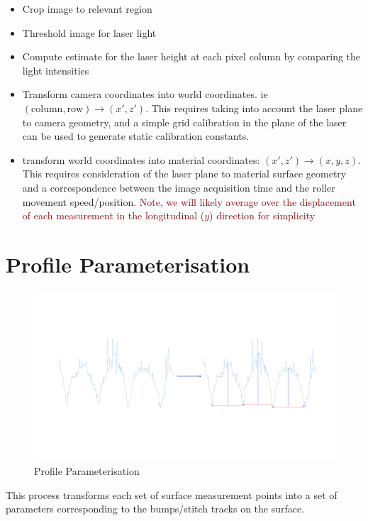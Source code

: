 \documentclass[12pt]{report}
\newcommand{\tcr}[1]{\textcolor{darkRed}{#1}}
\begin{document}
        \begin{itemize}
            \item Crop image to relevant region
            \item Threshold image for laser light
            \item Compute estimate for the laser height at each pixel column by comparing the light intensities
            \item Transform camera coordinates into world coordinates.
            ie $(\text{column}, \text{row}) \rightarrow (x',z')$. This requires taking into account the laser plane to camera geometry, and a simple grid calibration in the plane of the laser can be used to generate static calibration constants.
            \item transform world coordinates into material coordinates: $(x',z') \rightarrow (x,y,z)$. This requires consideration of the laser plane to material surface geometry and a correspondence between the image acquisition time and the roller movement speed/position. \tcr{Note, we will likely average over the displacement of each measurement in the longitudinal ($y$) direction for simplicity}
        \end{itemize}
    
    \section{Profile Parameterisation}
        \begin{figure}
            \centering
            \includegraphics[width=\textwidth,trim={0 5cm 0 5cm},clip]{temp_parameterise.pdf}
            \caption{Profile Parameterisation}
        \end{figure}
        This process transforms each set of surface measurement points into a set of parameters corresponding to the bumps/stitch tracks on the surface.
        
\end{document}

